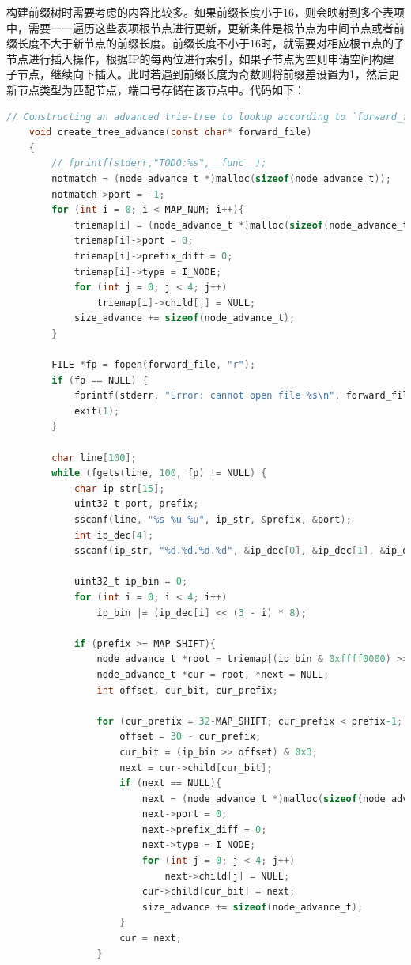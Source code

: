 \documentclass[UTF8]{report}
\begin{document}
构建前缀树时需要考虑的内容比较多。如果前缀长度小于16，则会映射到多个表项中，需要一一遍历这些表项根节点进行更新，更新条件是根节点为中间节点或者前缀长度不大于新节点的前缀长度。前缀长度不小于16时，就需要对相应根节点的子节点进行插入操作，根据IP的每两位进行索引，如果子节点为空则申请空间构建子节点，继续向下插入。此时若遇到前缀长度为奇数则将前缀差设置为1，然后更新节点类型为匹配节点，端口号存储在该节点中。代码如下：

\begin{lstlisting}[language=C]
    // Constructing an advanced trie-tree to lookup according to `forward_file`
    void create_tree_advance(const char* forward_file)
    {
        // fprintf(stderr,"TODO:%s",__func__);
        notmatch = (node_advance_t *)malloc(sizeof(node_advance_t));
        notmatch->port = -1;
        for (int i = 0; i < MAP_NUM; i++){
            triemap[i] = (node_advance_t *)malloc(sizeof(node_advance_t));
            triemap[i]->port = 0;
            triemap[i]->prefix_diff = 0;
            triemap[i]->type = I_NODE;
            for (int j = 0; j < 4; j++)
                triemap[i]->child[j] = NULL;
            size_advance += sizeof(node_advance_t);
        }
    
        FILE *fp = fopen(forward_file, "r");
        if (fp == NULL) {
            fprintf(stderr, "Error: cannot open file %s\n", forward_file);
            exit(1);
        }
    
        char line[100];
        while (fgets(line, 100, fp) != NULL) {
            char ip_str[15];
            uint32_t port, prefix;
            sscanf(line, "%s %u %u", ip_str, &prefix, &port);
            int ip_dec[4];
            sscanf(ip_str, "%d.%d.%d.%d", &ip_dec[0], &ip_dec[1], &ip_dec[2], &ip_dec[3]);
            
            uint32_t ip_bin = 0;
            for (int i = 0; i < 4; i++) 
                ip_bin |= (ip_dec[i] << (3 - i) * 8);
            
            if (prefix >= MAP_SHIFT){
                node_advance_t *root = triemap[(ip_bin & 0xffff0000) >> MAP_SHIFT];
                node_advance_t *cur = root, *next = NULL;
                int offset, cur_bit, cur_prefix;
    
                for (cur_prefix = 32-MAP_SHIFT; cur_prefix < prefix-1; cur_prefix+=2){
                    offset = 30 - cur_prefix;
                    cur_bit = (ip_bin >> offset) & 0x3;
                    next = cur->child[cur_bit];
                    if (next == NULL){
                        next = (node_advance_t *)malloc(sizeof(node_advance_t));
                        next->port = 0;
                        next->prefix_diff = 0;
                        next->type = I_NODE;
                        for (int j = 0; j < 4; j++)
                            next->child[j] = NULL;
                        cur->child[cur_bit] = next;
                        size_advance += sizeof(node_advance_t);
                    }
                    cur = next;
                }
    

\end{lstlisting}
\end{document}
